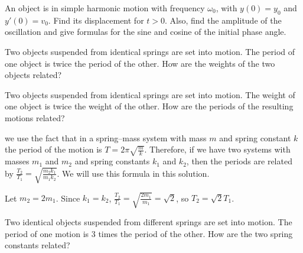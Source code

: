 \documentclass{ximera}
\begin{document}
\begin{problem}\label{exer:6.1.18}
An object is in simple harmonic motion
with frequency $\omega_0$, with $y(0)=y_0$ and $y'(0)=v_0$. Find
its displacement for $t>0$. Also, find the amplitude of the
oscillation and give formulas for the sine and cosine of the initial
phase angle.
\end{problem}

\begin{problem}\label{exer:6.1.19}
Two objects suspended from identical springs are set into
motion.  The period of one object is twice the period of the other.
How are the weights of the two objects related?
\end{problem}

\begin{problem}\label{exer:6.1.20}
Two objects suspended from identical springs are set into motion. The
weight of one object is twice the weight of the other. How are the
periods of the resulting motions related?

\begin{solution}
we use
the fact that in a spring--mass system with mass $m$ and spring
constant $k$ the period of the motion is $T=2\pi\sqrt{\frac{m}{k}}$. Therefore, if we have two systems with masses $m_1$ and $m_2$
and spring constants $k_1$ and $k_2$, then the periods are related by
$\frac{T_2}{T_1}=\sqrt{\frac{m_2k_1}{m_1k_2}}$. We will use this
formula in this solution.

Let $m_2=2m_1$. Since $k_1=k_2$, $\frac{T_2}{T_1} =\sqrt{\frac{2m_1}{m_1}} =\sqrt2$, so $T_2=\sqrt2T_1$.

\end{solution}
\end{problem}

\begin{problem}\label{exer:6.1.21}
Two identical objects suspended from different springs are set into
motion. The period of one motion is 3 times the period of the
other. How are the two spring constants related?
\end{problem}
\end{document}
